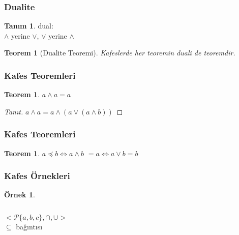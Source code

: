 \documentclass[dvipsnames]{beamer}
\theoremstyle{definition}
\newtheorem{tanim}[theorem]{Tanım}
\theoremstyle{example}
\newtheorem{ornek}[theorem]{Örnek}
\theoremstyle{plain}
\newtheorem{teorem}[theorem]{Teorem}
\begin{document}
\begin{frame}
  \frametitle{Dualite}

  \begin{tanim}
    \alert{dual}:\\
    $\wedge$ yerine $\vee$, $\vee$ yerine $\wedge$
  \end{tanim}

  \pause
  \begin{teorem}[Dualite Teoremi]
    Kafeslerde her teoremin duali de teoremdir.
  \end{teorem}
\end{frame}

\begin{frame}
  \frametitle{Kafes Teoremleri}

  \begin{teorem}
    $a \wedge a = a$
  \end{teorem}

  \pause
  \begin{proof}[Tanıt]
    $a \wedge a = a \wedge (a \vee (a \wedge b))$
  \end{proof}
\end{frame}

\begin{frame}
  \frametitle{Kafes Teoremleri}

  \begin{teorem}
    $a \preceq b \Leftrightarrow a \wedge b$
    $ = a \Leftrightarrow a \vee b = b$
  \end{teorem}
\end{frame}

\begin{frame}
  \frametitle{Kafes Örnekleri}

  \begin{ornek}
    \begin{columns}
      \[
	<\mathcal{P}\{a,b,c\},\cap,\cup>
      \]
      $\subseteq$ bağıntısı

      \begin{center}
      \end{center}
    \end{columns}
  \end{ornek}
\end{frame}
\end{document}
